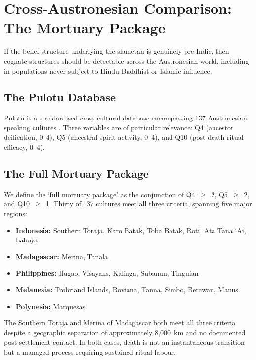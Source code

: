 \documentclass[12pt,a4paper]{article}
\begin{document}
\section{Cross-Austronesian Comparison: The Mortuary Package}

If the belief structure underlying the slametan is genuinely pre-Indic, then cognate structures should be detectable across the Austronesian world, including in populations never subject to Hindu-Buddhist or Islamic influence.

\subsection{The Pulotu Database}

Pulotu is a standardised cross-cultural database encompassing 137 Austronesian-speaking cultures \citep{watts_2015}. Three variables are of particular relevance: Q4 (ancestor deification, 0--4), Q5 (ancestral spirit activity, 0--4), and Q10 (post-death ritual efficacy, 0--4).

\subsection{The Full Mortuary Package}

We define the `full mortuary package' as the conjunction of Q4~$\geq$~2, Q5~$\geq$~2, and Q10~$\geq$~1. Thirty of 137 cultures meet all three criteria, spanning five major regions:

\begin{itemize}[nosep]
\item \textbf{Indonesia:} Southern Toraja, Karo Batak, Toba Batak, Roti, Ata Tana `Ai, Laboya
\item \textbf{Madagascar:} Merina, Tanala
\item \textbf{Philippines:} Ifugao, Visayans, Kalinga, Subanun, Tinguian
\item \textbf{Melanesia:} Trobriand Islands, Roviana, Tanna, Simbo, Berawan, Manus
\item \textbf{Polynesia:} Marquesas
\end{itemize}

The Southern Toraja and Merina of Madagascar both meet all three criteria despite a geographic separation of approximately 8,000~km and no documented post-settlement contact. In both cases, death is not an instantaneous transition but a managed process requiring sustained ritual labour.
\end{document}
